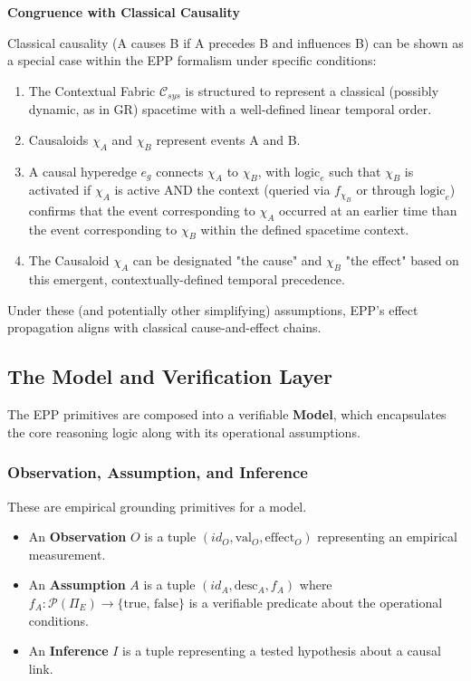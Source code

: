 \textbf{Congruence with Classical Causality}
        
        Classical causality (A causes B if A precedes B and influences B) can be shown as a special case within the EPP formalism under specific conditions:
        \begin{enumerate}
            \item The Contextual Fabric \(\mathcal{C}_{sys}\) is structured to represent a classical (possibly dynamic, as in GR) spacetime with a well-defined linear temporal order.
            \item Causaloids \(\chi_A\) and \(\chi_B\) represent events A and B.
            \item A causal hyperedge \(e_g\) connects \(\chi_A\) to \(\chi_B\), with \(\text{logic}_e\) such that \(\chi_B\) is activated if \(\chi_A\) is active AND the context (queried via \(f_{\chi_B}\) or through \(\text{logic}_e\)) confirms that the event corresponding to \(\chi_A\) occurred at an earlier time than the event corresponding to \(\chi_B\) within the defined spacetime context.
            \item The Causaloid \(\chi_A\) can be designated "the cause" and \(\chi_B\) "the effect" based on this emergent, contextually-defined temporal precedence.
        \end{enumerate}
        Under these (and potentially other simplifying) assumptions, EPP's effect propagation aligns with classical cause-and-effect chains.

\newpage
\subsection{The Model and Verification Layer}
\label{sec:formalization_model}

The EPP primitives are composed into a verifiable \textbf{Model}, which encapsulates the core reasoning logic along with its operational assumptions.

\subsubsection{Observation, Assumption, and Inference}
These are empirical grounding primitives for a model.
\begin{itemize}
    \item An \textbf{Observation} \(O\) is a tuple \((id_O, \text{val}_O, \text{effect}_O)\) representing an empirical measurement.
    \item An \textbf{Assumption} \(A\) is a tuple \((id_A, \text{desc}_A, f_A)\) where \(f_A: \mathcal{P}(\Pi_E) \to \{\text{true, false}\}\) is a verifiable predicate about the operational conditions.
    \item An \textbf{Inference} \(I\) is a tuple representing a tested hypothesis about a causal link.
\end{itemize}

